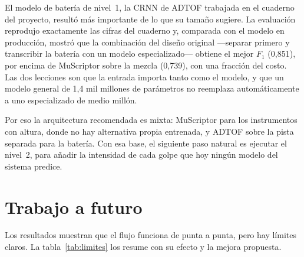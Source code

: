 \documentclass[11pt,a4paper]{article}
\begin{document}
El modelo de batería de nivel~1, la CRNN de ADTOF trabajada en el cuaderno del proyecto, resultó más
importante de lo que su tamaño sugiere. La evaluación reprodujo exactamente las cifras del cuaderno y,
comparada con el modelo en producción, mostró que la combinación del diseño original ---separar primero y
transcribir la batería con un modelo especializado--- obtiene el mejor $F_1$ (0{,}851), por encima de
MuScriptor sobre la mezcla (0{,}739), con una fracción del costo. Las dos lecciones son que la entrada
importa tanto como el modelo, y que un modelo general de 1{,}4 mil millones de parámetros no reemplaza
automáticamente a uno especializado de medio millón.

Por eso la arquitectura recomendada es mixta: MuScriptor para los instrumentos con altura, donde no hay
alternativa propia entrenada, y ADTOF sobre la pista separada para la batería. Con esa base, el siguiente
paso natural es ejecutar el nivel~2, para añadir la intensidad de cada golpe que hoy ningún modelo del
sistema predice.

\section{Trabajo a futuro}

Los resultados muestran que el flujo funciona de punta a punta, pero hay límites claros. La
tabla~\ref{tab:limites} los resume con su efecto y la mejora propuesta.
\end{document}
